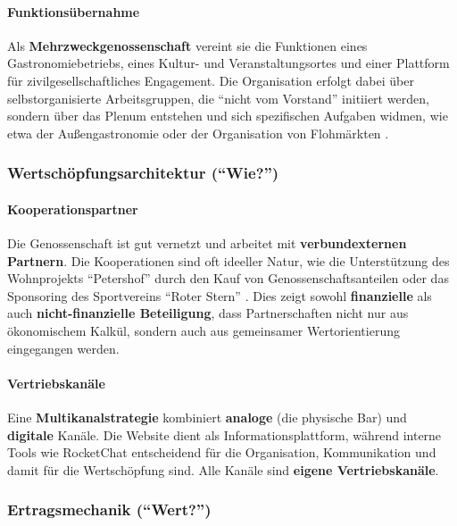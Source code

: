 \paragraph{Funktionsübernahme}
Als \textbf{Mehrzweckgenossenschaft} vereint sie die Funktionen eines Gastronomiebetriebs, eines Kultur- und Veranstaltungsortes und einer Plattform für zivilgesellschaftliches Engagement. Die Organisation erfolgt dabei über selbstorganisierte Arbeitsgruppen, die \enquote{nicht vom Vorstand} initiiert werden, sondern über das Plenum entstehen und sich spezifischen Aufgaben widmen, wie etwa der Außengastronomie oder der Organisation von Flohmärkten \parencite{mederInterviewZurGeschaftsmodellanalyse2025}.

\subsubsection{Wertschöpfungsarchitektur (\enquote{Wie?})}

\paragraph{Kooperationspartner}
Die Genossenschaft ist gut vernetzt und arbeitet mit \textbf{verbundexternen Partnern}. Die Kooperationen sind oft ideeller Natur, wie die Unterstützung des Wohnprojekts \enquote{Petershof} durch den Kauf von Genossenschaftsanteilen oder das Sponsoring des Sportvereins \enquote{Roter Stern} \parencite{mederInterviewZurGeschaftsmodellanalyse2025}. Dies zeigt sowohl \textbf{finanzielle} als auch \textbf{nicht-finanzielle Beteiligung}, dass Partnerschaften nicht nur aus ökonomischem Kalkül, sondern auch aus gemeinsamer Wertorientierung eingegangen werden.

\paragraph{Vertriebskanäle}
Eine \textbf{Multikanalstrategie} kombiniert \textbf{analoge} (die physische Bar) und \textbf{digitale} Kanäle. Die Website dient als Informationsplattform, während interne Tools wie RocketChat entscheidend für die Organisation, Kommunikation und damit für die Wertschöpfung sind. Alle Kanäle sind \textbf{eigene Vertriebskanäle}.

\subsubsection{Ertragsmechanik (\enquote{Wert?})}

